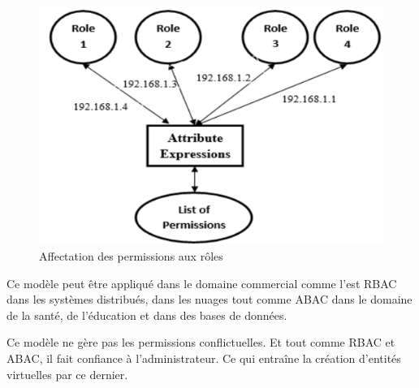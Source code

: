 \begin{figure}[h!]
    \centering
		\includegraphics[scale=0.7]{chap2/images/rolepermissionauto.png}
    \caption{Affectation des permissions aux rôles}
	 \label{figPermissionRole}
\end{figure}

\label{sectionDomaineApplicationAR-BAC}

Ce modèle peut être appliqué dans le domaine commercial comme l'est RBAC dans les systèmes distribués, dans les nuages tout comme ABAC dans le domaine de la santé, de l'éducation et dans des bases de données. 


\label{sectionInconvéniantAR-BAC}

Ce modèle ne gère pas les permissions conflictuelles. Et tout comme RBAC et ABAC, il fait confiance à l'administrateur. Ce qui entraîne la création d'entités virtuelles par ce dernier.


\label{sectionAERBAC}

